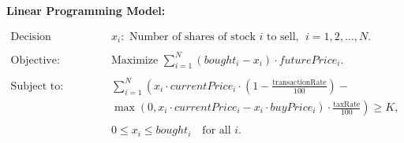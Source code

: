 \documentclass{article}
\begin{document}
\textbf{Linear Programming Model:}

\begin{align*}
\text{Decision Variables:} \quad & x_i: \text{ Number of shares of stock } i \text{ to sell, } \; i = 1, 2, \ldots, N.\\
\\
\text{Objective:} \quad & \text{Maximize } \sum_{i=1}^{N} (bought_i - x_i) \cdot futurePrice_i. \\
\\
\text{Subject to:} \quad & \sum_{i=1}^{N} \left( x_i \cdot currentPrice_i \cdot \left(1 - \frac{\text{transactionRate}}{100}\right) - \right. \\
& \left. \max(0, x_i \cdot currentPrice_i - x_i \cdot buyPrice_i) \cdot \frac{\text{taxRate}}{100} \right) \geq K, \\
\\
& 0 \leq x_i \leq bought_i \quad \text{for all } i.
\end{align*}
\end{document}
